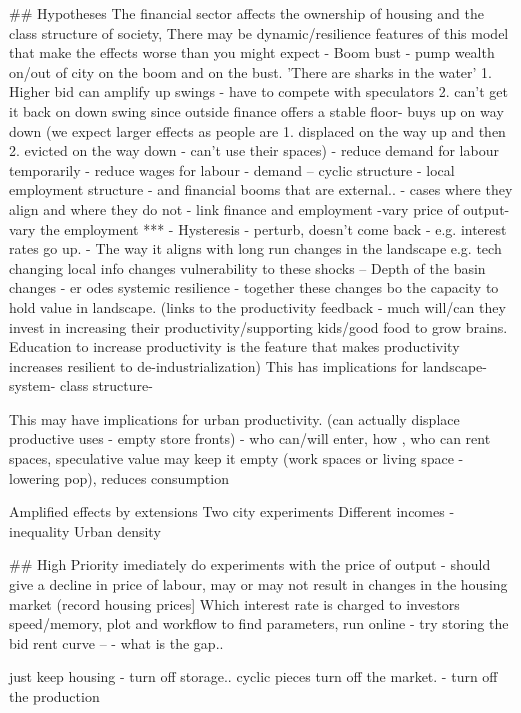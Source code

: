 ## Hypotheses
The financial sector affects the ownership of housing and the class structure of society, 
There may be dynamic/resilience features of this model that make the effects worse than you might expect
- Boom bust - pump wealth on/out of city on the boom and on the bust. 'There are sharks in the water' 1. Higher bid can amplify up swings - have to compete with speculators 2. can't get it back on down swing since outside finance offers a stable floor- buys up on way down (we expect larger effects as people are 1. displaced on the way up and then 2. evicted on the way down - can't use their spaces)
  - reduce demand for labour temporarily - reduce wages for labour - demand -- cyclic structure - local employment structure - and financial booms that are external.. - cases where they align and where they do not
  - link finance and employment -vary price of output- vary the employment *** 
- Hysteresis - perturb, doesn't come back - e.g. interest rates go up.
- The way it aligns with long run changes in the landscape e.g. tech changing local info changes vulnerability to these shocks -- Depth of the basin changes - er   odes systemic resilience - together these changes bo the capacity to hold value in landscape. (links to the productivity feedback - much will/can they invest in increasing their productivity/supporting kids/good food to grow brains. Education to increase productivity is the feature that makes productivity increases resilient to de-industrialization)
This has implications for landscape- system- class structure- 

This may have implications for urban productivity. (can actually displace productive uses - empty store fronts) - who can/will enter, how , who can rent spaces, speculative value may keep it empty (work spaces or living space - lowering pop), reduces consumption


Amplified effects by extensions
Two city experiments
Different incomes  - inequality
Urban density



## High Priority
imediately do experiments with the price of output - should give a decline in price of labour, may or may not result in changes in the housing market (record housing prices]
Which interest rate is charged to investors
speed/memory, plot and workflow to find parameters, run online - try storing the bid rent curve -- - what is the gap.. 

just keep housing - turn off storage..  cyclic pieces turn off the market. - turn off the production






